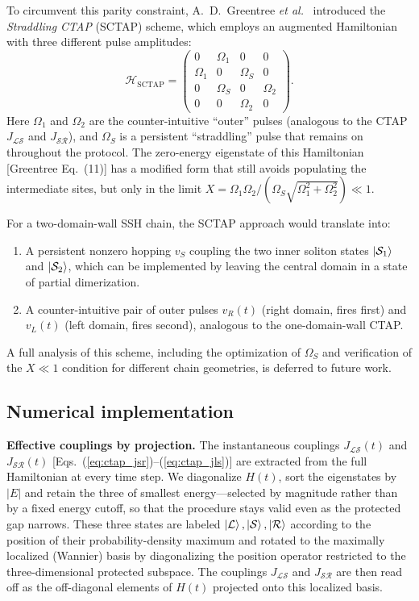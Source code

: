 \documentclass[
  reprint,
  amsmath,
  amssymb,
  aps,
  prb,
  floatfix,
  longbibliography,
]{revtex4-2}
\newcommand{\JLS}{J_{\mathcal{LS}}}
\newcommand{\JSR}{J_{\mathcal{SR}}}
\newcommand{\ketL}{\ket{\mathcal{L}}}
\newcommand{\ketS}{\ket{\mathcal{S}}}
\newcommand{\ketR}{\ket{\mathcal{R}}}
\begin{document}
To circumvent this parity constraint, A.~D.~Greentree \textit{et al.}~\cite{Greentree2004}
introduced the \emph{Straddling CTAP} (SCTAP) scheme, which employs an
augmented Hamiltonian with three different pulse amplitudes:
\begin{equation}
  \mathcal{H}_{\mathrm{SCTAP}} =
  \begin{pmatrix}
    0 & \Omega_1 & 0 & 0 \\
    \Omega_1 & 0 & \Omega_S & 0 \\
    0 & \Omega_S & 0 & \Omega_2 \\
    0 & 0 & \Omega_2 & 0
  \end{pmatrix}.
  \label{eq:sctap}
\end{equation}
Here $\Omega_1$ and $\Omega_2$ are the counter-intuitive ``outer'' pulses
(analogous to the CTAP $\JLS$ and $\JSR$), and $\Omega_S$ is a persistent
``straddling'' pulse that remains on throughout the protocol. The zero-energy
eigenstate of this Hamiltonian [Greentree Eq.~(11)] has a modified form that
still avoids populating the intermediate sites, but only in the limit
$X = \Omega_1\Omega_2 / (\Omega_S\sqrt{\Omega_1^2 + \Omega_2^2}) \ll 1$.

For a two-domain-wall SSH chain, the SCTAP approach would translate into:
\begin{enumerate}
  \item A persistent nonzero hopping $v_S$ coupling the two inner soliton
    states $\ket{\mathcal{S}_1}$ and $\ket{\mathcal{S}_2}$, which can be
    implemented by leaving the central domain in a state of partial
    dimerization.
  \item A counter-intuitive pair of outer pulses $v_R(t)$ (right domain,
    fires first) and $v_L(t)$ (left domain, fires second), analogous to the
    one-domain-wall CTAP.
\end{enumerate}
A full analysis of this scheme, including the optimization of $\Omega_S$ and
verification of the $X \ll 1$ condition for different chain geometries, is
deferred to future work.

\subsection{Numerical implementation}
\label{sec:ctap_implementation}

\textbf{Effective couplings by projection.}
The instantaneous couplings $\JLS(t)$ and $\JSR(t)$
[Eqs.~(\ref{eq:ctap_jsr})--(\ref{eq:ctap_jls})] are extracted from the full
Hamiltonian at every time step. We diagonalize $H(t)$, sort the eigenstates by
$|E|$ and retain the three of smallest energy---selected by magnitude rather
than by a fixed energy cutoff, so that the procedure stays valid even as the
protected gap narrows. These three states are labeled $\ketL,\ketS,\ketR$
according to the position of their probability-density maximum and rotated to
the maximally localized (Wannier) basis by diagonalizing the position operator
restricted to the three-dimensional protected subspace. The couplings $\JLS$
and $\JSR$ are then read off as the off-diagonal elements of $H(t)$ projected
onto this localized basis.
\end{document}

